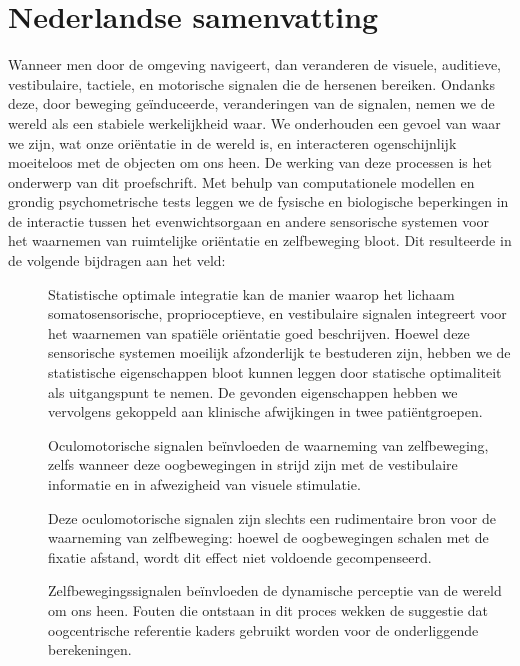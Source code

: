 \clearpage
\pagestyle{empty}

\chapter*{Nederlandse samenvatting}
{}

Wanneer men door de omgeving navigeert, dan veranderen de visuele, auditieve, vestibulaire, tactiele, en motorische signalen die de hersenen bereiken. Ondanks deze, door beweging ge\"induceerde, veranderingen van de signalen, nemen we de wereld als een stabiele werkelijkheid waar. We onderhouden een gevoel van waar we zijn, wat onze ori\"entatie in de wereld is, en interacteren ogenschijnlijk moeiteloos met de objecten om ons heen. De werking van deze processen is het onderwerp van dit proefschrift. Met behulp van computationele modellen en grondig psychometrische tests leggen we de fysische en biologische beperkingen in de interactie tussen het evenwichtsorgaan en andere sensorische systemen voor het waarnemen van ruimtelijke ori\"entatie en zelfbeweging bloot. Dit resulteerde in de volgende bijdragen aan het veld:

\begin{description}
\item[] Statistische optimale integratie kan de manier waarop het lichaam somatosensorische, proprioceptieve, en vestibulaire signalen integreert voor het waarnemen van spati\"ele ori\"entatie goed beschrijven. Hoewel deze sensorische systemen moeilijk afzonderlijk te bestuderen zijn, hebben we de statistische eigenschappen bloot kunnen leggen door statische optimaliteit als uitgangspunt te nemen. De gevonden eigenschappen hebben we vervolgens gekoppeld aan klinische afwijkingen in twee pati\"entgroepen.
\item[] Oculomotorische signalen be\"invloeden de waarneming van zelfbeweging, zelfs wanneer deze oogbewegingen in strijd zijn met de vestibulaire informatie en in afwezigheid van visuele stimulatie.
\item[] Deze oculomotorische signalen zijn slechts een rudimentaire bron voor de waarneming van zelfbeweging: hoewel de oogbewegingen schalen met de fixatie afstand, wordt dit effect niet voldoende gecompenseerd.
\item[] Zelfbewegingssignalen be\"invloeden de dynamische perceptie van de wereld om ons heen. Fouten die ontstaan in dit proces wekken de suggestie dat oogcentrische referentie kaders gebruikt worden voor de onderliggende berekeningen.
\end{description}

